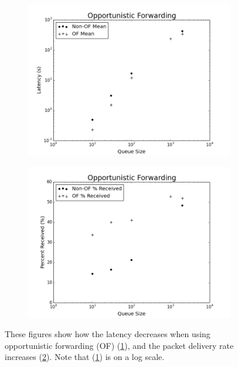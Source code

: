         \begin{figure}
            \centering
            \begin{subfigure}{\textwidth}
                \centering
                \includegraphics[width=\linewidth]{./images/OF_Latency.png}
                \caption{}
                \label{fig:of_latency}
            \end{subfigure}
            \begin{subfigure}{\textwidth}
                \includegraphics[width=\linewidth]{./images/OF_Received.png}
                \caption{}
                \label{fig:of_recieved}
            \end{subfigure}
            \caption{These figures show how the latency decreases when using opportunistic forwarding (OF) (\ref{fig:of_latency}), and the packet delivery rate increases (\ref{fig:of_recieved}). Note that (\ref{fig:of_latency}) is on a log scale.}
            \label{fig:opportunistic_forwarding}
        \end{figure}

